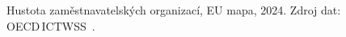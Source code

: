 \def\strStavZamestnavateleHustotaMapaTitle{Hustota zaměstnavatelských organizací (2024)}%
\def\strStavZamestnavateleHustotaMapaColorbarLabel{hustota [\% zaměstnanců]}%
\def\strStavZamestnavateleHustotaMapaCaption{\centering Hustota zaměstnavatelských organizací, EU mapa, 2024. Zdroj dat: OECD\,ICTWSS~\cite{oecd_aias_ictwss_ED_pct}.}%
%
\begin{figure}[htbp]
  \centering
  \resizebox{0.92\linewidth}{!}{}
  \caption{\strStavZamestnavateleHustotaMapaCaption}
  \label{fig:stav_zamestnavatele_hustota_mapa}
\end{figure}
